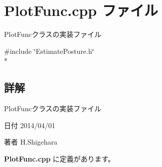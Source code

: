 \section{Plot\-Func.\-cpp ファイル}
\label{_plot_func_8cpp}


Plot\-Funcクラスの実装ファイル  


{\ttfamily \#include \char`\"{}Estimate\-Posture.\-h\char`\"{}}\\*


\subsection{詳解}
Plot\-Funcクラスの実装ファイル \begin{DoxyDate}{日付}
2014/04/01 
\end{DoxyDate}
\begin{DoxyAuthor}{著者}
H.\-Shigehara 
\end{DoxyAuthor}


 {\bf Plot\-Func.\-cpp} に定義があります。

